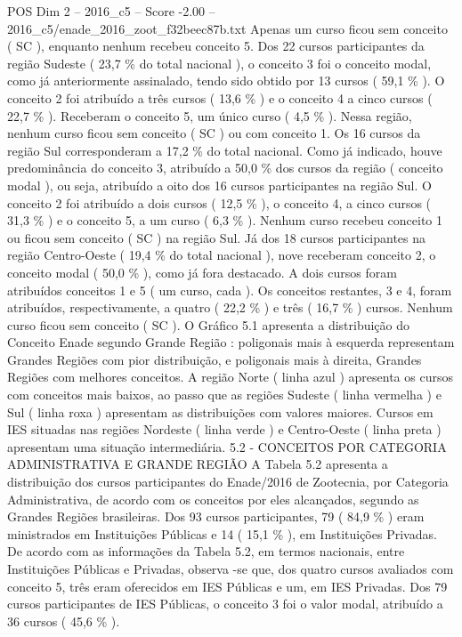 \begin{textsample}{POS Dim 2 – 2016\_c5 – Score -2.00 – 2016\_c5/enade\_2016\_zoot\_f32beec87b.txt}
Apenas um curso ficou sem conceito ( SC ), enquanto nenhum recebeu conceito 5.
Dos 22 cursos participantes da região Sudeste ( 23,7 \% do total nacional ), o conceito 3 foi o conceito modal, como já anteriormente assinalado, tendo sido obtido por 13 cursos ( 59,1 \% ).
O conceito 2 foi atribuído a três cursos ( 13,6 \% ) e o conceito 4 a cinco cursos ( 22,7 \% ).
Receberam o conceito 5, um único curso ( 4,5 \% ).
Nessa região, nenhum curso ficou sem conceito ( SC ) ou com conceito 1.
Os 16 cursos da região Sul corresponderam a 17,2 \% do total nacional.
Como já indicado, houve predominância do conceito 3, atribuído a 50,0 \% dos cursos da região ( conceito modal ), ou seja, atribuído a oito dos 16 cursos participantes na região Sul.
O conceito 2 foi atribuído a dois cursos ( 12,5 \% ), o conceito 4, a cinco cursos ( 31,3 \% ) e o conceito 5, a um curso ( 6,3 \% ).
Nenhum curso recebeu conceito 1 ou ficou sem conceito ( SC ) na região Sul.
Já dos 18 cursos participantes na região Centro-Oeste ( 19,4 \% do total nacional ), nove receberam conceito 2, o conceito modal ( 50,0 \% ), como já fora destacado.
A dois cursos foram atribuídos conceitos 1 e 5 ( um curso, cada ).
Os conceitos restantes, 3 e 4, foram atribuídos, respectivamente, a quatro ( 22,2 \% ) e três ( 16,7 \% ) cursos.
Nenhum curso ficou sem conceito ( SC ).
O Gráfico 5.1 apresenta a distribuição do Conceito Enade segundo Grande Região : poligonais mais à esquerda representam Grandes Regiões com pior distribuição, e poligonais mais à direita, Grandes Regiões com melhores conceitos.
A região Norte ( linha azul ) apresenta os cursos com conceitos mais baixos, ao passo que as regiões Sudeste ( linha vermelha ) e Sul ( linha roxa ) apresentam as distribuições com valores maiores.
Cursos em IES situadas nas regiões Nordeste ( linha verde ) e Centro-Oeste ( linha preta ) apresentam uma situação intermediária. 5.2 - CONCEITOS POR CATEGORIA ADMINISTRATIVA E GRANDE REGIÃO A Tabela 5.2 apresenta a distribuição dos cursos participantes do Enade/2016 de Zootecnia, por Categoria Administrativa, de acordo com os conceitos por eles alcançados, segundo as Grandes Regiões brasileiras.
Dos 93 cursos participantes, 79 ( 84,9 \% ) eram ministrados em Instituições Públicas e 14 ( 15,1 \% ), em Instituições Privadas.
De acordo com as informações da Tabela 5.2, em termos nacionais, entre Instituições Públicas e Privadas, observa -se que, dos quatro cursos avaliados com conceito 5, três eram oferecidos em IES Públicas e um, em IES Privadas.
Dos 79 cursos participantes de IES Públicas, o conceito 3 foi o valor modal, atribuído a 36 cursos ( 45,6 \% ).

\end{textsample}
